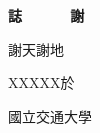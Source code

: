 \begin{center}
\Large
\textbf{誌~~~~~~謝}
\end{center}

\vspace{1cm}
\linespread{2}%
\selectfont
\hspace{0.25cm}

謝天謝地

\vspace{3cm}
\begin{flushright}
XXXXX於

國立交通大學\NameofDepartmentInstituteCN

\ThesisDateTW
\end{flushright}
